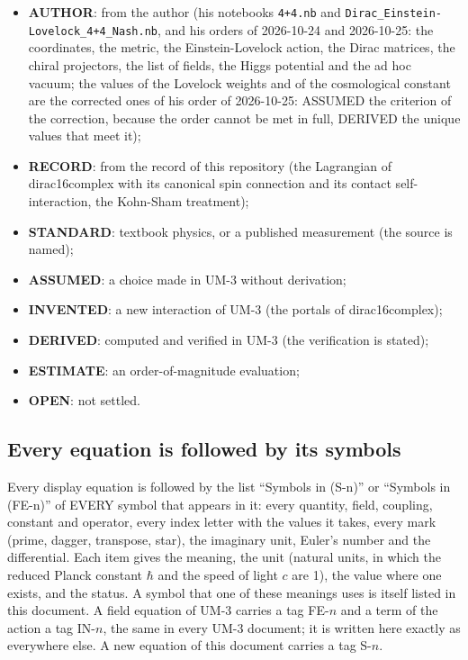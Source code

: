 \documentclass[
  10pt,
]{article}
\providecommand{\tightlist}{%
  \setlength{\itemsep}{0pt}\setlength{\parskip}{0pt}}
\begin{document}
\begin{itemize}
\tightlist
\item
  \textbf{AUTHOR}: from the author (his notebooks \texttt{4+4.nb} and
  \texttt{Dirac\_Einstein-Lovelock\_4+4\_Nash.nb}, and his orders of
  2026-10-24 and 2026-10-25: the coordinates, the metric, the
  Einstein-Lovelock action, the Dirac matrices, the chiral projectors,
  the list of fields, the Higgs potential and the ad hoc vacuum; the
  values of the Lovelock weights and of the cosmological constant are
  the corrected ones of his order of 2026-10-25: ASSUMED the criterion
  of the correction, because the order cannot be met in full, DERIVED
  the unique values that meet it);
\item
  \textbf{RECORD}: from the record of this repository (the Lagrangian of
  dirac16complex with its canonical spin connection and its contact
  self-interaction, the Kohn-Sham treatment);
\item
  \textbf{STANDARD}: textbook physics, or a published measurement (the
  source is named);
\item
  \textbf{ASSUMED}: a choice made in UM-3 without derivation;
\item
  \textbf{INVENTED}: a new interaction of UM-3 (the portals of
  dirac16complex);
\item
  \textbf{DERIVED}: computed and verified in UM-3 (the verification is
  stated);
\item
  \textbf{ESTIMATE}: an order-of-magnitude evaluation;
\item
  \textbf{OPEN}: not settled.
\end{itemize}

\hypertarget{every-equation-is-followed-by-its-symbols}{%
\subsection{Every equation is followed by its
symbols}\label{every-equation-is-followed-by-its-symbols}}

Every display equation is followed by the list ``Symbols in (S-n)'' or
``Symbols in (FE-n)'' of EVERY symbol that appears in it: every
quantity, field, coupling, constant and operator, every index letter
with the values it takes, every mark (prime, dagger, transpose, star),
the imaginary unit, Euler's number and the differential. Each item gives
the meaning, the unit (natural units, in which the reduced Planck
constant \(\hbar\) and the speed of light \(c\) are 1), the value where
one exists, and the status. A symbol that one of these meanings uses is
itself listed in this document. A field equation of UM-3 carries a tag
FE-\(n\) and a term of the action a tag IN-\(n\), the same in every UM-3
document; it is written here exactly as everywhere else. A new equation
of this document carries a tag S-\(n\).
\end{document}
